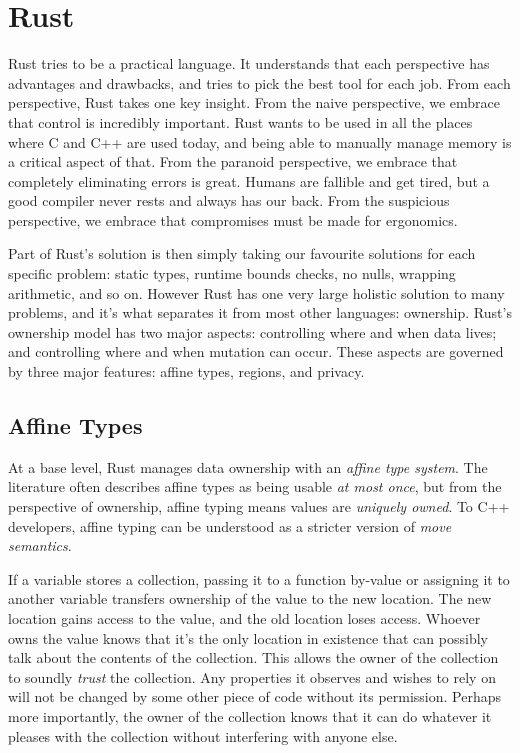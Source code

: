 \chapter{Rust}
\label{ch:rust}

Rust tries to be a practical language. It understands that each perspective has
advantages and drawbacks, and tries to pick the best tool for each job. From each
perspective, Rust takes one key insight. From the naive perspective, we embrace
that control is incredibly important. Rust wants to be used in all the places where
C and C++ are used today, and being able to manually manage memory is a critical
aspect of that. From the paranoid perspective, we embrace that completely
eliminating errors is great. Humans are fallible and get tired, but a good compiler
never rests and always has our back. From the suspicious perspective, we embrace
that compromises must be made for ergonomics.

Part of Rust's solution is then simply taking our favourite solutions for
each specific problem: static types, runtime bounds checks, no nulls, wrapping
arithmetic, and so on. However Rust has one very large holistic solution to
many problems, and it's what separates it from most other languages: ownership.
Rust's ownership model has two major aspects: controlling where and when data lives;
and controlling where and when mutation can occur. These aspects are governed by
three major features: affine types, regions, and privacy.






\section{Affine Types}

At a base level, Rust manages data ownership with an \emph{affine type system}. The
literature often describes affine types as being usable \emph{at most once}, but from
the perspective of ownership, affine typing means values are \emph{uniquely owned}.
To C++ developers, affine typing can be understood as a stricter version of
\emph{move semantics}.

If a variable stores a collection, passing it to a function by-value or
assigning it to another variable transfers ownership of the value to the new
location. The new location gains access to the value, and the old location loses
access. Whoever owns the value knows that it's the only location
in existence that can possibly talk about the contents of the collection.
This allows the owner of the collection to soundly \emph{trust} the
collection. Any properties it observes and wishes to rely on will not be changed
by some other piece of code without its permission. Perhaps more importantly,
the owner of the collection knows that it can do whatever it pleases with the
collection without interfering with anyone else.

